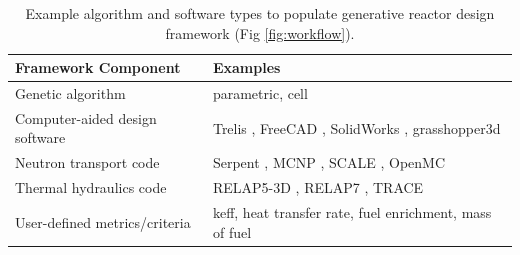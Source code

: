 \documentclass[letterpaper,11pt]{article}
\begin{document}
\begin{table}[h]
        \caption{Example algorithm and software types to populate generative reactor 
        design framework (Fig \ref{fig:workflow}).}
        \label{tab:examples}
        \centering
        \doublespacing
        \small
        \begin{tabular}{ll}
        \hline
        \textbf{Framework Component} & \textbf{Examples}\\ \hline
        Genetic algorithm & parametric, cell \cite{renner_genetic_2003} \\
        Computer-aided design software & Trelis \cite{noauthor_trelis_2018}, FreeCAD \cite{falck_freecad_2012}, SolidWorks \cite{lombard_solidworks_2008}, grasshopper3d \cite{rutten_grasshopper3d_2015} \\
        Neutron transport code & Serpent \cite{leppanen_serpent_2014}, MCNP \cite{werner_mcnp6._2018}, SCALE \cite{bucholz_scale:_1982}, OpenMC \cite{romano_openmc_2013} \\ 
        Thermal hydraulics code & RELAP5-3D \cite{strydom_comparison_2016}, RELAP7 \cite{andrs_relap-7_2012}, TRACE \cite{xu_multi-physics_2006}\\
        User-defined metrics/criteria & keff, heat transfer rate, fuel enrichment, mass of fuel \\ \hline
\end{tabular}
\end{table}




\end{document}
